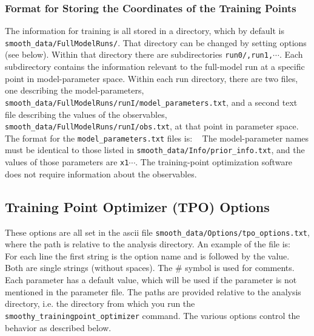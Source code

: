 \documentclass[UserManual.tex]{subfiles}
\begin{document}
\begin{sloppypar}
\subsubsection{Format for Storing the Coordinates of the Training Points}
The information for training is all stored in a directory, which by default is {{\tt smooth\_data/FullModelRuns/}}. That directory can be changed by setting options (see below). Within that directory there are subdirectories {\tt run0/,run1,}$\cdots$. Each subdirectory contains the information relevant to the full-model run at a specific point in model-parameter space. Within each run directory, there are two files, one describing the model-parameters, {\tt smooth\_data/FullModelRuns/runI/model\_parameters.txt}, and a second text file describing the values of the observables, {\tt smooth\_data/FullModelRuns/runI/obs.txt}, at that point in parameter space. The format for the {\tt model\_parameters.txt} files is:
{\tt
\vspace*{-8pt}{\tt \begin{Verbatim}[commandchars=\\\{\}]
parameter_name_1 x1  
parameter_name_2 x2  
.
\end{Verbatim}
}\vspace*{-8pt}}
The model-parameter names must be identical to those listed in {\tt smooth\_data/Info/prior\_info.txt}, and the values of those parameters are {\tt x1}$\cdots$. The training-point optimization software does not require information about the observables.

\subsection{Training Point Optimizer (TPO) Options}
These options are all set in the ascii file {\tt smooth\_data/Options/tpo\_options.txt}, where the path is relative to the analysis directory. An example of the file is:
{\tt
\vspace*{-8pt}{\tt \begin{Verbatim}[commandchars=\\\{\}]
#LogFileName               tpolog.txt  # comment out to direct output to screen
TPO_Method  MCQuadratic  # can be "MC", "MCSphere", "MCSimplex", "MCSimplexPlus1", "MCQuadratic", "MCSphereQuadratic"
TPO_NTrainingPts    0   # only relevant for OptimizeMethod="MCSphere" or "MC"
TPO_NMC  10000
TPO_ALPHA 0.01
TPO_LAMBDA 2.5
TPO_Include_LAMBDA_Uncertainty true
TPO_FullModelRunsDirName  smooth_data/FullModelRuns
TPO_RANSEED 12345
#TPO_ReadPoints 0,1,4-7,10,11-13,21
#TPO_FreezePoints 0,1,4-7,10,11-13,21
\end{Verbatim}
}\vspace*{-8pt}
}
For each line the first string is the option name and is followed by the value. Both are single strings (without spaces). The \# symbol is used for comments. Each parameter has a default value, which will be used if the parameter is not mentioned in the parameter file.  The paths are provided relative to the analysis directory, i.e. the directory from which you run the {\tt smoothy\_trainingpoint\_optimizer} command. The various options control the behavior as described below.


\end{sloppypar}
\end{document}
